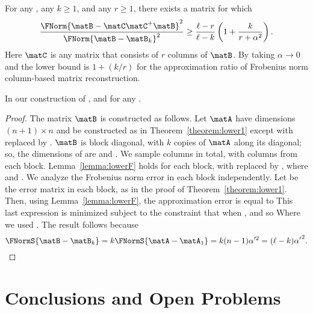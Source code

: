 \begin{theorem}\label{theorem:lowerF}
For any , any $k \geq 1$, and any $r \geq 1$, there exists a matrix  for which
$$\frac{\FNorm{\matB-\matC\matC^+\matB}^2}{\FNorm{\matB-\matB_k}^2}
\ge\frac{\ell-r}{\ell-k}\left(1+\frac{k}{r+\alpha^2}\right).
$$
Here $\matC$ is any matrix that consists of $r$ columns of $\matB$.
By taking $\alpha \rightarrow 0$ and \math{\ell\rightarrow\infty} the  lower bound is $1+\left(k/r\right)$ for the approximation ratio of Frobenius
norm column-based matrix reconstruction.
\end{theorem}In our construction of \math{\matB},
 and  for any .
\begin{proof}
The matrix $\matB$ is constructed as follows. Let $\matA$ have
dimensions $(n+1) \times n$ and be constructed as in
Theorem~\ref{theorem:lower1} except with \math{\alpha} replaced by
.
$\matB$ is block diagonal, with $k$ copies of $\matA$ along its diagonal;
so,
the dimensions of \math{\matB} are  and .
We sample  columns in total, with  columns from each block.
Lemma~\ref{lemma:lowerF} holds for each block, with 
replaced by , where  and
. We analyze the
Frobenius norm error in each block independently.
Let  be the error matrix in each block, as in the proof of
Theorem~\ref{theorem:lower1}.
Then, using Lemma~\ref{lemma:lowerF},
the approximation error is equal to
This last expression is minimized subject to the constraint that
 when , and so
Where we used .
 The result follows because $$\FNormS{\matB-\matB_k}=k\FNormS{\matA-\matA_1}=k(n-1){\alpha}'^2
=(\ell-k){\alpha'}^2.$$
\end{proof}




\section{Conclusions and Open Problems} \label{sec:open}

